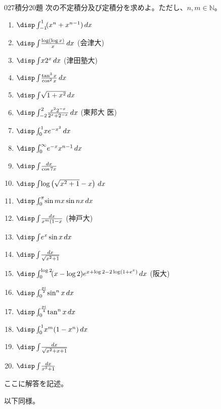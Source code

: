 \begin{thm}{027}{}{積分20題}
 次の不定積分及び定積分を求めよ。ただし、$n, m\in\mathbb{N}$。
 \begin{enumerate}
  \item $\disp \int_{-1}^1\! (x^n+x^{n-1}) \,dx$
  \item $\disp \int\! \frac{\log\left(\log x\right)}{x} \,dx$ (会津大)
  \item $\disp \int\! x2^x \,dx$ (津田塾大)
  \item $\disp \int\! \frac{\tan^3 x}{\cos^2 x} \,dx$
  \item $\disp \int\! \sqrt{1+x^2} \,dx$
  \item $\disp \int_{-2}^2\! \frac{x^2 2^{-x}}{2^x+2^{-x}} \,dx$ (東邦大 医)
  \item $\disp \int_0^1\! xe^{-x^2} \,dx$
  \item $\disp \int_0^\infty\! e^{-x}x^{n-1} \,dx$
  \item $\disp \int\! \frac{dx}{\cos 7x}$
  \item $\disp \int\! \log\left(\sqrt{x^2+1}-x\right) \,dx$
  \item $\disp \int_0^\pi\! \sin mx \sin nx \,dx$
  \item $\disp \int\! \frac{dx}{x^m(1-x}$ (神戸大)
  \item $\disp \int\! e^x\sin x \,dx$
  \item $\disp \int\! \frac{dx}{\sqrt{x^2+1}}$
  \item $\disp \int_0^{\log 2}\! (x-\log 2)e^{x+\log 2 -2\log (1+e^x)} \,dx$ (阪大)
  \item $\disp \int_0^{\frac{pi}{2}}\! \sin^n x \,dx$
  \item $\disp \int_0^{\frac{pi}{4}}\! \tan^n x \,dx$
  \item $\disp \int_0^1\! x^m(1-x^n) \,dx$
  \item $\disp \int\! \frac{dx}{\sqrt{x^2+x+1}}$
  \item $\disp \int\! \frac{dx}{x^3+1}$
 \end{enumerate}
\end{thm}

ここに解答を記述。

以下同様。